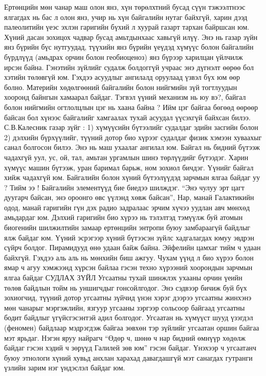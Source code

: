 Ертөнцийн мөн чанар маш олон янз, хүн төрөлхтний бусад сүүн тэжээлтнээс ялгагдах нь бас л олон янз, учир нь хүн байгалийн нутаг байхгүй, харин дээд палеолитийн үеэс эхлэн гаригийн бүхий л хуурай газарт тархан байршсан юм. Хүний дасан зохицох чадвар бусад амьтдынхаас хавьгүй илүү. Энэ нь газар зүйн янз бүрийн бүс нутгуудад, түүхийн янз бүрийн үеүдэд хүмүүс болон байгалийн бүрдлүүд (амьдрах орчин болон геобиоценоз) янз бүрээр харилцан үйлчилж ирсэн байна. Гэнэтийн зүйлийг судалж болдоггүй учраас энэ дүгнэлт өөрөө бол хэтийн төлөвгүй юм. Гэхдээ асуудлыг ангилалд оруулаад үзвэл бүх юм өөр болно. Материйн хөдөлгөөний байгалийн болон нийгмийн зүй тогтлуудын хооронд байнгын хамаарал байдаг. Тэгвэл үүний механизм нь юу вэ?, байгал болон нийгмийн огтлолцлын цэг нь хаана байна ? Ийм цэг байгаа бөгөөд өөрөөр байсан бол хүнээс байгалийг хамгаалах тухай асуудал үүсэхгүй байхсан билээ.
С.В.Калесник газар зүйг : 1) хүмүүсийн бүтээлийг судалдаг эдийн засгийн болон 2) дэлхийн бүрхүүлийг, түүний дотор био хүрээг судалдаг физик хэмээн хуваахыг санал болгосон билээ. Энэ нь маш ухаалаг ангилал юм. Байгал нь бидний бүтээж чадахгүй уул, ус, ой, тал, амьтан ургамлын шинэ төрлүүдийг бүтээдэг. Харин хүмүүс машин бүтээж, уран баримал барьж, ном зохиол бичдэг. Үүнийг байгал хийж чадахгүй юм.
Байгалийн болон хүний бүтээлүүдэд зарчмын ялгаа байдаг уу ? Тийм ээ ! Байгалийн элементүүд бие биедээ шилждэг. “Энэ чулуу эрт цагт дуугарч байсан, энэ ороонго өвс үүлэнд хөвж байсан”, Нар, манай Галактикийн одод, манай гаригийн гүн дэх радио задралаас эрчим хүчээ уудлан авч мөнхөд амьдардаг юм.
Дэлхий гаригийн био хүрээ нь тэлэлтэд тэмүүлж буй атомын биогенийн шилжилтийн замаар ертөнцийн энтропи буюу замбараагүй байдлыг ялж байдаг юм. Үүний эсрэгээр хүний бүтээсэн зүйлс хадгалагдах юмуу эвдрэн сүйрч болдог. Пирамидууд өнө удаан байж байна. Эйфелийн цамхаг тийм ч удаан байхгүй. Гэхдээ аль аль нь мөнхийн биш ажгуу. Чухам үүнд л био хүрээ болон ямар ч агуу хэмжээнд хүрсэн байлаа гэсэн техно хүрээний хоорондын зарчмын ялгаа байдаг
СУДЛАХ ЗҮЙЛ
Угсаатны тухай шинжлэх ухааны орчин үеийн төлөв байдлын тойм нь уншигчдыг гонсойлгодог. Энэ сэдвээр бичиж буй бүх зохиогчид, түүний дотор угсаатны зүйчид үнэн хэрэг дээрээ угсаатны жинхэнэ мөн чанарыг мэргэжлийн, язгуур угсааны зэргээр сольсоор байгаад угсаатны бодит байдлыг үгүйсгэсэнтэй адил болгодог. Угсаатан нь хүмүүст шууд үзэгдэл (феномен) байдлаар мэдрэгдэж байгаа зөвхөн тэр зүйлийг угсаатан оршин байгаа мэт ярьдаг. Нэгэн яруу найрагч “Өдөр ч, шөнө ч нар бидний өмнүүр хөдөлж байдаг гэсэн хэдий ч зөрүүд Галилей зөв юм” гэсэн байдаг. Үнэхээр ч угсаатанч буюу этнологи хүний хувьд анхлан харахад давагдашгүй мэт санагдах гутранги үзлийн зарим нэг үндэслэл байдаг юм.
